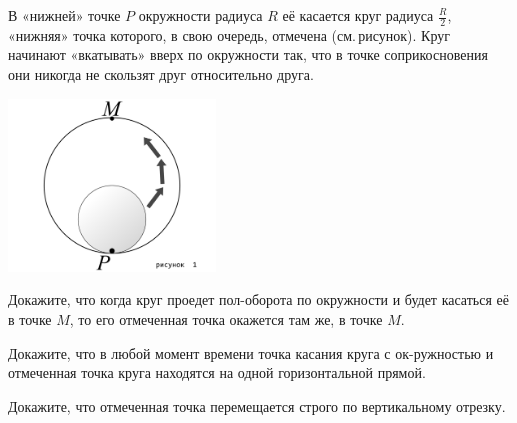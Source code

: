 ﻿
\noindent В «нижней» точке $P$ окружности радиуса $R$ её касается круг радиуса $\tfrac{R}{2}$, «нижняя» точка которого, в свою очередь, отмечена (см.\,рисунок). Круг начинают «вкатывать» вверх по окружности так, что в точке соприкосновения они никогда не скользят друг относительно друга.

\centerline{\includegraphics[width=5.5cm]{stats/2018/images/circle-move}}

\begin{enumerate}
\itA Докажите, что когда круг проедет пол-оборота по окружности и будет касаться её в точке $M$, то его отмеченная точка окажется там же, в точке $M$.

\itB Докажите, что в любой момент времени точка касания круга с ок-\linebreak ружностью и отмеченная точка круга находятся на одной горизонтальной прямой.

\itC Докажите, что отмеченная точка перемещается строго по вертикальному отрезку.
\end{enumerate}